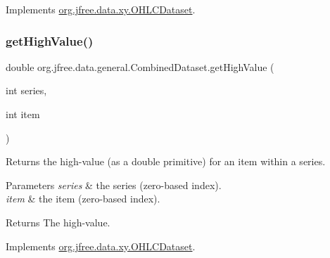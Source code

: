 Implements \mbox{\hyperlink{interfaceorg_1_1jfree_1_1data_1_1xy_1_1_o_h_l_c_dataset_a03f647b09b1a04ae0c2eb2bc5116d4d4}{org.\+jfree.\+data.\+xy.\+O\+H\+L\+C\+Dataset}}.

\mbox{\label{classorg_1_1jfree_1_1data_1_1general_1_1_combined_dataset_a17e07dbe03ac67b77b4aa57e17f7b61a}} 
\subsubsection{\texorpdfstring{get\+High\+Value()}{getHighValue()}}
{\footnotesize\ttfamily double org.\+jfree.\+data.\+general.\+Combined\+Dataset.\+get\+High\+Value (\begin{DoxyParamCaption}\item[{int}]{series,  }\item[{int}]{item }\end{DoxyParamCaption})}

Returns the high-\/value (as a double primitive) for an item within a series.


\begin{DoxyParams}{Parameters}
{\em series} & the series (zero-\/based index). \\
\hline
{\em item} & the item (zero-\/based index).\\
\hline
\end{DoxyParams}
\begin{DoxyReturn}{Returns}
The high-\/value. 
\end{DoxyReturn}


Implements \mbox{\hyperlink{interfaceorg_1_1jfree_1_1data_1_1xy_1_1_o_h_l_c_dataset_acd02ab8db72bebf0234954bd962365cb}{org.\+jfree.\+data.\+xy.\+O\+H\+L\+C\+Dataset}}.

\mbox{\label{classorg_1_1jfree_1_1data_1_1general_1_1_combined_dataset_a2c07e48f3cfd8b379856b7729c485273}} 
